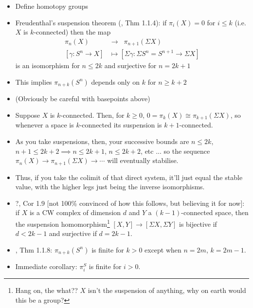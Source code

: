 \documentclass{MetricNotes2023}
\begin{document}
\begin{itemize}
\item Define homotopy groups
\item Freudenthal's suspension theorem (\autocite{cobordism}, Thm 1.1.4): if \(\pi_i(X)=0\) for \(i\leq k\) (i.e. \(X\) is \(k\)-connected) then the map 
\begin{align*}
\pi_n(X) \;\;&\to\;\; \pi_{n+1}(\Sigma X)\\
[\gamma : S^n \to X] &\mapsto [\Sigma \gamma : \Sigma S^n=S^{n+1} \to \Sigma X]
\end{align*}
is an isomorphism for \(n \leq 2k\) and surjective for \(n=2k+1\)
\item This implies \(\pi_{n+k}(S^n)\) depends only on \(k\) for \(n\geq k+2\)
\item (Obviously be careful with basepoints above)
\item Suppose \(X\) is \(k\)-connected. Then, for \(k\geq 0\), \(0=\pi_k(X)\cong \pi_{k+1}(\Sigma X)\), so whenever a space is \(k\)-connected its suspension is \(k+1\)-connected. 
\item As you take suspensions, then, your successive bounds are \(n \leq 2k\), \(n+1\leq 2k+2\implies n \leq 2k+1\), \(n\leq 2k+2\), etc ... so the sequence \(\pi_n(X)\to \pi_{n+1}(\Sigma X)\to \cdots\) will eventually stabilise.  
\item Thus, if you take the colimit of that direct system, it'll just equal the stable value, with the higher legs just being the inverse isomorphisms.
\item ?\autocite{ass}, Cor 1.9 [not 100\% convinced of how this follows, but believing it for now]: if \(X\) is a CW complex of dimension \(d\) and \(Y\) a \((k-1)\)-connected space, then the suspension homomorphism\footnote{Hang on, the what?? \(X\) isn't the suspension of anything, why on earth would this be a group?} \([X, Y]\to[\Sigma X, \Sigma Y]\) is bijective if \(d<2k-1\) and surjective if \(d=2k-1\). 

\item \autocite{cobordism}, Thm 1.1.8: \(\pi_{n+k}(S^n)\) is finite for \(k>0\) except when \(n=2m\), \(k=2m-1\). 

\item Immediate corollary: \(\pi_i^S\) is finite for \(i>0\). 
\end{itemize}
\end{document}
